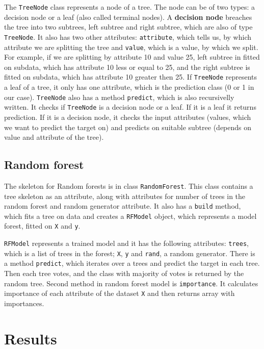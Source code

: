 \documentclass{article}
\begin{document}
The \texttt{TreeNode} class represents a node of a tree. The node can be of two types: a decision node or a leaf (also called terminal nodes). A \textbf{decision node} breaches the tree into two subtrees, left subtree and right subtree, which are also of type \texttt{TreeNode}. It also has two other attributes: \texttt{attribute}, which tells us, by which attribute we are splitting the tree and \texttt{value}, which is a value, by which we split. For example, if we are splitting by attribute 10 and value 25, left subtree in fitted on subdata, which has attribute 10 less or equal to 25, and the right subtree is fitted on subdata, which has attribute 10 greater then 25. If \texttt{TreeNode} represents a leaf of a tree, it only has one attribute, which is the prediction class (0 or 1 in our case). \texttt{TreeNode} also has a method \texttt{predict}, which is also recursivelly written. It checks if \texttt{TreeNode} is a decision node or a leaf. If it is a leaf it returns prediction. If it is a decision node, it checks the input attributes (values, which we want to predict the target on) and predicts on suitable subtree (depends on value and attribute of the tree).

\subsection{Random forest}

The skeleton for Random forests is in class \texttt{RandomForest}. This class contains a tree skeleton as an attribute, along with attributes for number of trees in the random forest and random generator attribute. It also has a \texttt{build} method, which fits a tree on data and creates a \texttt{RFModel} object, which represents a model forest, fitted on \texttt{X} and \texttt{y}.

\texttt{RFModel} represents a trained model and it has the following attributes: \texttt{trees}, which is a list of trees in the forest; \texttt{X}, \texttt{y} and \texttt{rand}, a random generator. There is a method \texttt{predict}, which iterates over a trees and predict the target in each tree. Then each tree votes, and the class with majority of votes is returned by the random tree. Second method in random forest model is \texttt{importance}. It calculates importance of each attribute of the dataset \texttt{X} and then returns array with importances.

\section{Results}
\end{document}
